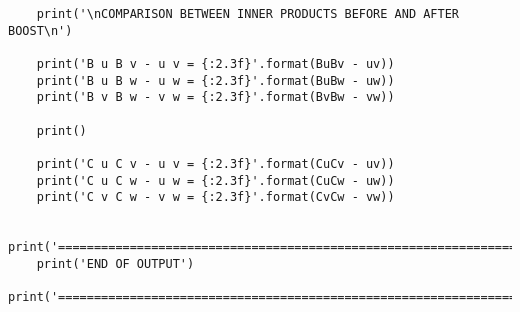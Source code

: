 \documentclass[12pt,notitlepage]{report}
\begin{document}
\begin{verbatim}
	print('\nCOMPARISON BETWEEN INNER PRODUCTS BEFORE AND AFTER BOOST\n')
	
	print('B u B v - u v = {:2.3f}'.format(BuBv - uv))
	print('B u B w - u w = {:2.3f}'.format(BuBw - uw))
	print('B v B w - v w = {:2.3f}'.format(BvBw - vw))
	
	print()
	
	print('C u C v - u v = {:2.3f}'.format(CuCv - uv))
	print('C u C w - u w = {:2.3f}'.format(CuCw - uw))
	print('C v C w - v w = {:2.3f}'.format(CvCw - vw))
	
	print('======================================================================')
	print('END OF OUTPUT')
	print('======================================================================')
	
\end{verbatim}
\end{document}
